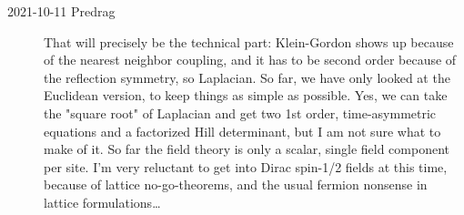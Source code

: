 \begin{description}
\item[2021-10-11 Predrag]
That will precisely be the technical part: Klein-Gordon shows up because
of the nearest neighbor coupling, and it has to be second order because
of the reflection symmetry, so Laplacian. So far, we have only looked at
the Euclidean version, to keep things as simple as possible.  Yes, we can
take the "square root" of Laplacian and get two 1st order, time-asymmetric
equations and a factorized Hill determinant, but I am not sure what to
make of it. So far the field theory is only a scalar, single field
component per site. I'm very reluctant to get into Dirac spin-1/2 fields at
this time, because of lattice no-go-theorems, and the usual fermion
nonsense in lattice formulations…










\end{description}


\printbibliography[heading=subbibintoc,title={References}]
